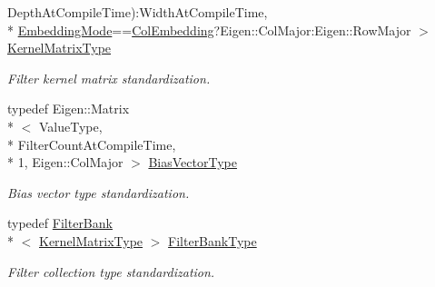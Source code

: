 \begin{DoxyCompactItemize}
Depth\-At\-Compile\-Time)\-:Width\-At\-Compile\-Time, \\*
\hyperlink{namespaceffnn_1_1layer_a254f16beba4fb335d935e9b43bb9e69a}{Embedding\-Mode}==\hyperlink{namespaceffnn_1_1layer_a254f16beba4fb335d935e9b43bb9e69aaede1065f5863208cae7e55561966a182}{Col\-Embedding}?Eigen\-::\-Col\-Major\-:\-Eigen\-::\-Row\-Major $>$ \hyperlink{classffnn_1_1layer_1_1_convolution_volume_ad9e8c125cbb78904740960464e3b6334}{Kernel\-Matrix\-Type}
\begin{DoxyCompactList}\small\item\em Filter kernel matrix standardization. \end{DoxyCompactList}\item 
typedef Eigen\-::\-Matrix\\*
$<$ Value\-Type, \\*
Filter\-Count\-At\-Compile\-Time, \\*
1, Eigen\-::\-Col\-Major $>$ \hyperlink{classffnn_1_1layer_1_1_convolution_volume_a590c7ebb2448c2636252101529337928}{Bias\-Vector\-Type}
\begin{DoxyCompactList}\small\item\em Bias vector type standardization. \end{DoxyCompactList}\item 
typedef \hyperlink{classffnn_1_1layer_1_1_filter_bank}{Filter\-Bank}\\*
$<$ \hyperlink{classffnn_1_1layer_1_1_convolution_volume_ad9e8c125cbb78904740960464e3b6334}{Kernel\-Matrix\-Type} $>$ \hyperlink{classffnn_1_1layer_1_1_convolution_volume_a00ac018ac5cb79534a5b3b4fbc55637e}{Filter\-Bank\-Type}
\begin{DoxyCompactList}\small\item\em Filter collection type standardization. \end{DoxyCompactList}\end{DoxyCompactItemize}
